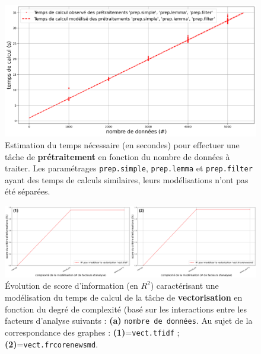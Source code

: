 			\begin{figure}[!htb]
				\centering
				\includegraphics[width=\textwidth]{figures/etude-temps-calcul-modelisation-1prep}
				\caption{Estimation du temps nécessaire (en secondes) pour effectuer une tâche de \textbf{prétraitement} en fonction du nombre de données à traiter. Les paramétrages \texttt{prep.simple}, \texttt{prep.lemma} et \texttt{prep.filter} ayant des temps de calculs similaires, leurs modélisations n'ont pas été séparées.}
				\label{figure:4.3.1-ETUDE-COUTS-TEMPS-CALCUL-MODELISATION-PREPROCESSING}
			\end{figure}
			
			
			\begin{figure}[!htb]
				\centering
				\includegraphics[width=\textwidth]{figures/etude-temps-calcul-analyse-facteurs-2vect}
				\caption{Évolution de score d'information (en \(R^2\)) caractérisant une modélisation du temps de calcul de la tâche de \textbf{vectorisation} en fonction du degré de complexité (basé sur les interactions entre les facteurs d'analyse suivants : \textbf{(a)} \texttt{nombre de données}. Au sujet de la correspondance des graphes : \textbf{(1)}=\texttt{vect.tfidf} ; \textbf{(2)}=\texttt{vect.frcorenewsmd}.}
				\label{figure:4.3.1-ETUDE-COUTS-TEMPS-CALCUL-ANALYSE-FACTEURS-VECTORIZATION}
			\end{figure}
		
